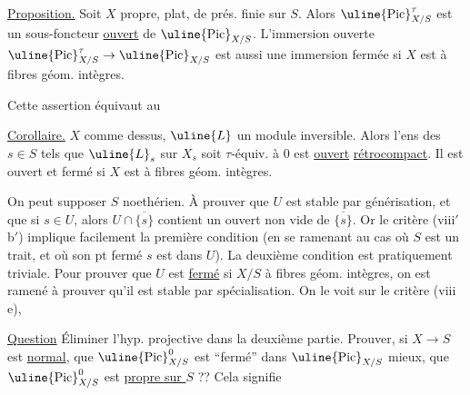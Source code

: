 \uline{Proposition.} Soit $X$ propre, plat, de prés. finie sur $S$. Alors $\uline{\mathrm{Pic}}^\tau_{X/S}$ est un sous-foncteur \uline{ouvert}  de $\uline{\mathrm{Pic}}_{X/S}$. L'immersion ouverte $\uline{\mathrm{Pic}}^\tau_{X/S}\to\uline{\mathrm{Pic}}_{X/S}$ est aussi une immersion fermée si $X$ est  à fibres géom. intègres.

Cette assertion équivaut au

\uline{Corollaire.} $X$ comme dessus, $\uline{L}$ un module inversible. Alors l'ens  des $s\in S$ tels que $\uline{L}_s$ sur $X_s$ soit  $\tau$-équiv. à $0$ est \uline{ouvert} \uline{rétrocompact}. Il est ouvert et fermé si $X$ est  à fibres géom. intègres.

On peut supposer $S$ noethérien. À prouver que $U$ est stable par générisation, et que si $s\in U$, alors $U\cap\overline{\{s\}}$  contient un ouvert non vide de $\overline{\{s\}}$. Or le critère (viii$'$ b$'$) implique facilement la première condition (en se ramenant au cas où  $S$ est un trait, et où son pt fermé $s$ est dans $U$). La deuxième condition est pratiquement triviale. Pour prouver que $U$ est \uline{fermé} si $X/S$  à fibres géom. intègres, on est  ramené à prouver qu'il est stable par spécialisation. On le voit sur le critère (viii e), 

\uline{Question} Éliminer l'hyp. projective dans la deuxième partie.
Prouver, si $X\to S$ est \uline{normal}, que $\uline{\mathrm{Pic}}^0_{X/S}$ est ``fermé'' dans $\uline{\mathrm{Pic}}_{X/S}$ mieux, que $\uline{\mathrm{Pic}}^0_{X/S}$ est \uline{propre sur $S$} ?? Cela signifie
